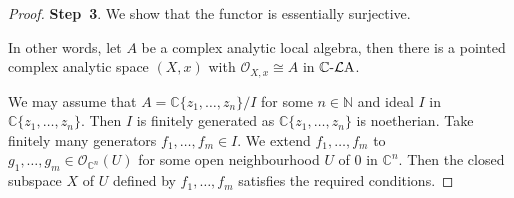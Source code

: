 \begin{proof}
    \textbf{Step~3}. We show that the functor is essentially surjective.

    In other words, let $A$ be a complex analytic local algebra, then there is a pointed complex analytic space $(X,x)$ with $\mathcal{O}_{X,x}\cong A$ in $\mathbb{C}\text{-}\mathcal{L}\mathrm{A}$.

    We may assume that $A=\mathbb{C}\{z_1,\ldots,z_n\}/I$ for some $n\in \mathbb{N}$ and ideal $I$ in $\mathbb{C}\{z_1,\ldots,z_n\}$. Then $I$ is finitely generated as $\mathbb{C}\{z_1,\ldots,z_n\}$ is noetherian. Take finitely many generators $f_1,\ldots,f_m\in I$. We extend $f_1,\ldots,f_m$ to $g_1,\ldots,g_m\in \mathcal{O}_{\mathbb{C}^n}(U)$ for some open neighbourhood $U$ of $0$ in $\mathbb{C}^n$. Then the closed subspace $X$ of $U$ defined by $f_1,\ldots,f_m$ satisfies the required conditions.
\end{proof}


